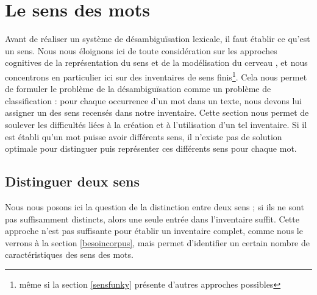 


\section{Le sens des mots}

Avant de réaliser un système de désambiguïsation lexicale, il faut établir ce
qu'est un sens. Nous nous éloignons ici de toute considération sur les
approches cognitives de la représentation du sens et de la modélisation du
cerveau \citep{harnad1990symbol}, et nous concentrons en particulier ici sur
des inventaires de sens finis\footnote{même si la section \ref{sensfunky}
présente d'autres approches possibles}. Cela nous permet de formuler le
problème de la désambiguïsation comme un problème de classification : pour
chaque occurrence d'un mot dans un texte, nous devons lui assigner un des sens
recensés dans notre inventaire. Cette section nous permet de soulever les
difficultés liées à la création et à l'utilisation d'un tel inventaire. Si il
est établi qu'un mot puisse avoir différents sens, il n'existe pas de solution
optimale pour distinguer puis représenter ces différents sens pour chaque mot.

\subsection{Distinguer deux sens}

Nous nous posons ici la question de la distinction entre deux sens ; si ils ne
sont pas suffisamment distincts, alors une seule entrée dans l'inventaire
suffit. Cette approche n'est pas suffisante pour établir un inventaire complet,
comme nous le verrons à la section \ref{besoincorpus}, mais permet d'identifier
un certain nombre de caractéristiques des sens des mots.

